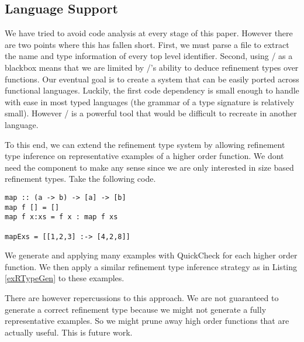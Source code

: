 \subsection{Language Support}\label{languageSupport}

We have tried to avoid code analysis at every stage of this paper. However there are two points where this has fallen short. First, we must parse a file to extract the name and type information of every top level identifier. Second, using \lhask/ as a blackbox means that we are limited by \lhask/'s ability to deduce refinement types over functions. Our eventual goal is to create a system that can be easily ported across functional languages. Luckily, the first code dependency is small enough to handle with ease in most typed languages (the grammar of a type signature is relatively small). However \lhask/ is a powerful tool that would be difficult to recreate in another language. 

To this end, we can extend the refinement type system by allowing refinement type inference on representative examples of a higher order function. We dont need the component to make any sense since we are only interested in size based refinement types. Take the following code.

\begin{lstlisting}
map :: (a -> b) -> [a] -> [b]
map f [] = [] 
map f x:xs = f x : map f xs

mapExs = [[1,2,3] :-> [4,2,8]]
 \end{lstlisting}

We generate and applying many examples with QuickCheck for each higher order function.
We then apply a similar refinement type inference strategy as in Listing \ref{exRTypeGen} to these examples.

There are however repercussions to this approach. We are not guaranteed to generate a correct refinement type because we might not generate a fully representative examples. So we might prune away high order functions that are actually useful. This is future work.
